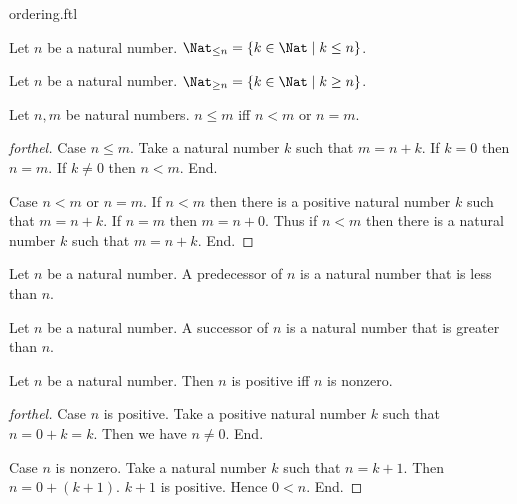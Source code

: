 \documentclass{naproche-library}
\begin{document}
\begin{smodule}{ordering.ftl}
  \begin{definition}[forthel,id=ARITHMETIC_04_72501526790144]
    Let $n$ be a natural number.
    $\Nat_{\leq n} = \{ k \in \Nat \mid k \leq n \}$.
  \end{definition}

  \begin{definition}[forthel,id=ARITHMETIC_04_1706933421604864]
    Let $n$ be a natural number.
    $\Nat_{\geq n} = \{ k \in \Nat \mid k \geq n \}$.
  \end{definition}

  \begin{proposition}[forthel,id=ARITHMETIC_04_5385415374667776]
    Let $n, m$ be natural numbers.
    $n \leq m$ iff $n < m$ or $n = m$.
  \end{proposition}
  \begin{proof}[forthel]
    Case $n \leq m$.
      Take a natural number $k$ such that $m = n + k$.
      If $k = 0$ then $n = m$. If $k \neq 0$ then $n < m$.
    End.

    Case $n < m$ or $n = m$.
      If $n < m$ then there is a positive natural number $k$ such that $m = n + k$.
      If $n = m$ then $m = n + 0$.
      Thus if $n < m$ then there is a natural number $k$ such that $m = n + k$.
    End.
  \end{proof}

  \begin{definition}[forthel,id=ARITHMETIC_04_6232154608500736]
    Let $n$ be a natural number.
    A predecessor of $n$ is a natural number that is less than $n$.
  \end{definition}

  \begin{definition}[forthel,id=ARITHMETIC_04_8147686326796288]
    Let $n$ be a natural number.
    A successor of $n$ is a natural number that is greater than $n$.
  \end{definition}

  \begin{proposition}[forthel,id=ARITHMETIC_04_4826285599621120]
    Let $n$ be a natural number.
    Then $n$ is positive iff $n$ is nonzero.
  \end{proposition}
  \begin{proof}[forthel]
    Case $n$ is positive.
      Take a positive natural number $k$ such that $n = 0 + k = k$.
      Then we have $n \neq 0$.
    End.

    Case $n$ is nonzero.
      Take a natural number $k$ such that $n = k + 1$.
      Then $n = 0 + (k + 1)$.
      $k + 1$ is positive.
      Hence $0 < n$.
    End.
  \end{proof}



\end{smodule}
\end{document}
